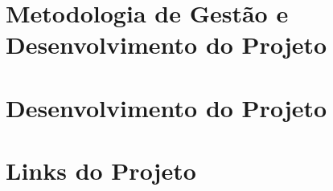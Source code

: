 \documentclass[
    12pt,               %
    openright,          %
    oneside,
    a4paper,            %
    MODELO,             %
    english,            %
    brazil,              %
    pstricks,border=12pt
   ]{ifsp-spo-inf-ctds}
\begin{document}
    \chapter{Metodologia de Gestão e Desenvolvimento
    do Projeto}
    
    
    \chapter{Desenvolvimento do Projeto}
    
    
    
    
    
    
    
    
    
    
    
    
    
    
    
    
    
    
    
   
    \chapter{Links do Projeto}
    
    
    
    
    
    
    
    
    

\end{document}
